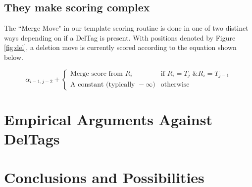\documentclass[fleqn,10pt]{SelfArx} %
\begin{document}


\subsection{They make scoring complex}

The ``Merge Move" in our template scoring routine is done in one of two distinct ways depending on if a DelTag is present.  With positions denoted by Figure \ref{fig:del}, a deletion move is currently scored according to the equation shown below.  


\[
 \alpha_{i-1,j-2}  +  \begin{cases}
			\text{Merge score from } R_{i}  & \text{if }  R_{i} = T_{j} \text{ \& } R_{i} = T_{j-1} \\
			\text{A constant (typically }-\infty\text{)} & \text{otherwise}
			\end{cases}
\]



\section{Empirical Arguments Against DelTags}




\section{Conclusions and Possibilities}



\end{document}
